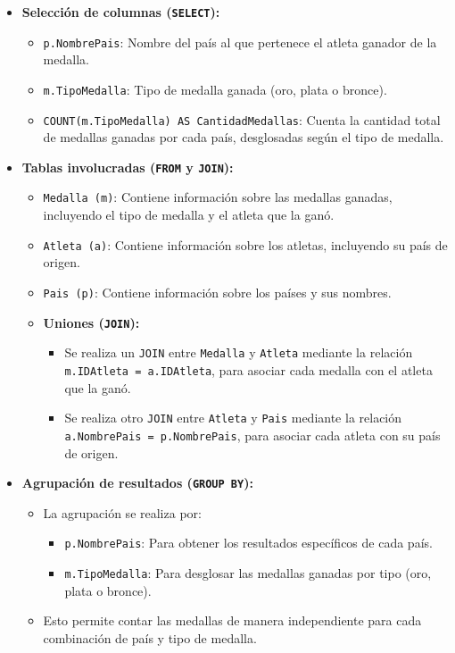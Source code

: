 \begin{itemize}
   \item \textbf{Selección de columnas (\texttt{SELECT}):}
   \begin{itemize}
       \item \texttt{p.NombrePais}: Nombre del país al que pertenece el atleta ganador de la medalla.
       \item \texttt{m.TipoMedalla}: Tipo de medalla ganada (oro, plata o bronce).
       \item \texttt{COUNT(m.TipoMedalla) AS CantidadMedallas}: Cuenta la cantidad total de medallas ganadas por cada país, desglosadas según el tipo de medalla.
   \end{itemize}

   \item \textbf{Tablas involucradas (\texttt{FROM} y \texttt{JOIN}):}
   \begin{itemize}
       \item \texttt{Medalla (m)}: Contiene información sobre las medallas ganadas, incluyendo el tipo de medalla y el atleta que la ganó.
       \item \texttt{Atleta (a)}: Contiene información sobre los atletas, incluyendo su país de origen.
       \item \texttt{Pais (p)}: Contiene información sobre los países y sus nombres.
       \item \textbf{Uniones (\texttt{JOIN}):}
       \begin{itemize}
           \item Se realiza un \texttt{JOIN} entre \texttt{Medalla} y \texttt{Atleta} mediante la relación \texttt{m.IDAtleta = a.IDAtleta}, para asociar cada medalla con el atleta que la ganó.
           \item Se realiza otro \texttt{JOIN} entre \texttt{Atleta} y \texttt{Pais} mediante la relación \texttt{a.NombrePais = p.NombrePais}, para asociar cada atleta con su país de origen.
       \end{itemize}
   \end{itemize}

   \item \textbf{Agrupación de resultados (\texttt{GROUP BY}):}
   \begin{itemize}
       \item La agrupación se realiza por:
       \begin{itemize}
           \item \texttt{p.NombrePais}: Para obtener los resultados específicos de cada país.
           \item \texttt{m.TipoMedalla}: Para desglosar las medallas ganadas por tipo (oro, plata o bronce).
       \end{itemize}
       \item Esto permite contar las medallas de manera independiente para cada combinación de país y tipo de medalla.
   \end{itemize}


\end{itemize}
